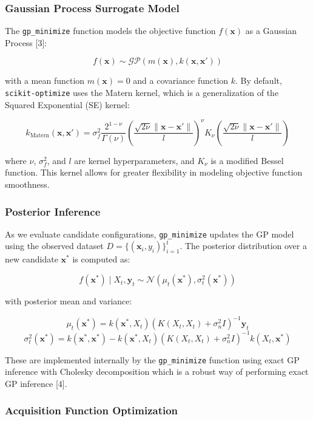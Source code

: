 \documentclass[11pt]{article}
\begin{document}
\subsubsection*{Gaussian Process Surrogate Model}

The \texttt{gp\_minimize} function models the objective function \( f(\mathbf{x}) \) as a Gaussian Process [3]:

\[
f(\mathbf{x}) \sim \mathcal{GP}(m(\mathbf{x}), k(\mathbf{x}, \mathbf{x}'))
\]

with a mean function \( m(\mathbf{x}) = 0 \) and a covariance function \( k \). By default, \texttt{scikit-optimize} uses the Matern kernel, which is a generalization of the Squared Exponential (SE) kernel:

\[
k_{\text{Matern}}(\mathbf{x}, \mathbf{x}') = \sigma_f^2 \frac{2^{1 - \nu}}{\Gamma(\nu)} \left( \frac{\sqrt{2\nu} \|\mathbf{x} - \mathbf{x}'\|}{l} \right)^\nu K_\nu \left( \frac{\sqrt{2\nu} \|\mathbf{x} - \mathbf{x}'\|}{l} \right)
\]

where \( \nu \), \( \sigma_f^2 \), and \( l \) are kernel hyperparameters, and \( K_\nu \) is a modified Bessel function. This kernel allows for greater flexibility in modeling objective function smoothness.

\subsubsection*{Posterior Inference}

As we evaluate candidate configurations, \texttt{gp\_minimize} updates the GP model using the observed dataset \( D = \{(\mathbf{x}_i, y_i)\}_{i=1}^t \). The posterior distribution over a new candidate \( \mathbf{x}^* \) is computed as:

\[
f(\mathbf{x}^*) \mid X_t, \mathbf{y}_t \sim \mathcal{N}(\mu_t(\mathbf{x}^*), \sigma_t^2(\mathbf{x}^*))
\]

with posterior mean and variance:

\[
\mu_t(\mathbf{x}^*) = k(\mathbf{x}^*, X_t) (K(X_t, X_t) + \sigma_n^2 I)^{-1} \mathbf{y}_t
\]
\[
\sigma_t^2(\mathbf{x}^*) = k(\mathbf{x}^*, \mathbf{x}^*) - k(\mathbf{x}^*, X_t) (K(X_t, X_t) + \sigma_n^2 I)^{-1} k(X_t, \mathbf{x}^*)
\]

These are implemented internally by the \texttt{gp\_minimize} function using exact GP inference with Cholesky decomposition which is a robust way of performing exact GP inference [4].

\subsubsection*{Acquisition Function Optimization}
\end{document}

